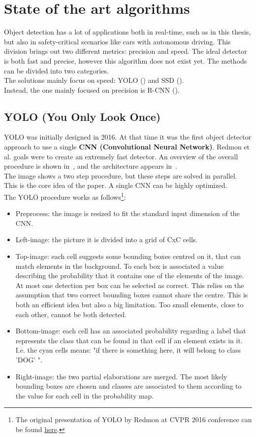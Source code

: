 \section{State of the art algorithms}
Object detection has a lot of applications both in real-time, such as in this thesis, but also in safety-critical scenarios like cars with autonomous driving. This division brings out two different metrics: precision and speed. The ideal detector is both fast and precise, however this algorithm does not exist yet. The methods can be divided into two categories.\\
The solutions mainly focus on speed: YOLO () and SSD ().\\
Instead, the one mainly focused on precision is R-CNN ().


\subsection{YOLO (You Only Look Once)} \label{sec:yolo}
YOLO\cite{yolo} was initially designed in 2016. At that time it was the first object detector approach to use a single \textbf{CNN (Convolutional Neural Network)}. Redmon et al. goals were to create an extremely fast detector. An overview of the overall procedure is shown in~, and the architecture appears in~.\\
The image shows a two step procedure, but these steps are solved in parallel. This is the core idea of the paper. A single CNN can be highly optimized.\\
The YOLO procedure works as follows\footnote{The original presentation of YOLO by Redmon at CVPR 2016 conference can be found \href{https://www.youtube.com/watch?v=NM6lrxy0bxs}{here}.}:
\begin{itemize}
	\item Preprocess: the image is resized to fit the standard input dimension of the CNN.
	\item Left-image: the picture it is divided into a grid of CxC cells.
	\item Top-image: each cell suggests some bounding boxes centred on it, that can match elements in the background. To each box is associated a value describing the probability that it contains one of the elements of the image.\\
	At most one detection per box can be selected as correct. This relies on the assumption that two correct bounding boxes cannot share the centre. This is both an efficient idea but also a big limitation. Too small elements, close to each other, cannot be both detected.
	\item Bottom-image: each cell has an associated probability regarding a label that represents the class that can be found in that cell if an element exists in it.\\
	I.e. the cyan cells means: "if there is something here, it will belong to class 'DOG' ".
	\item Right-image: the two partial elaborations are merged. The most likely bounding boxes are chosen and classes are associated to them according to the value for each cell in the probability map.
\end{itemize}
